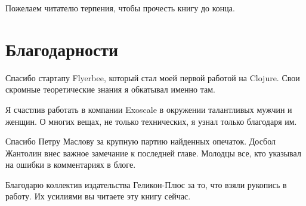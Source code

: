 Пожелаем читателю терпения, чтобы прочесть книгу до конца.

\section*{Благодарности}

Спасибо стартапу Flyerbee, который стал моей первой работой на Clojure. Свои
скромные теоретические знания я обкатывал именно там.

Я счастлив работать в компании Exoscale в окружении талантливых мужчин и
женщин. О многих вещах, не только технических, я узнал только благодаря им.

Спасибо Петру Маслову за крупную партию найденных опечаток. Досбол Жантолин внес
важное замечание к последней главе. Молодцы все, кто указывал на ошибки в
комментариях в блоге.

Благодарю коллектив издательства Геликон-Плюс за то, что взяли рукопись в
работу. Их усилиями вы читаете эту книгу сейчас.

